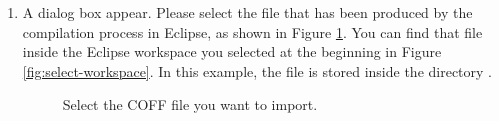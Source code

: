 \begin{enumerate}
\item
  A dialog box appear. Please select the  file that
  has been produced by the compilation process in Eclipse, as shown in
  Figure \ref{fig:mplab3}. You can find that file inside the Eclipse
  workspace you selected at the beginning in Figure
  \ref{fig:select-workspace}. In this example, the file is stored
  inside the directory
   .
%
\begin{figure}[htb]
\caption{Select the COFF file you want to import.}
\label{fig:mplab3}
\end{figure}


\end{enumerate}
